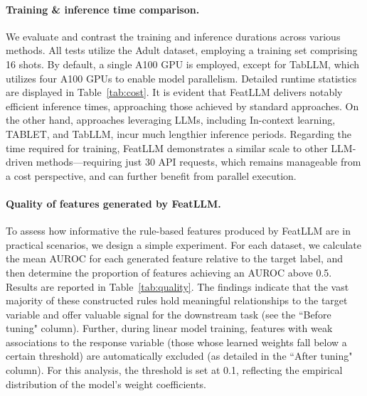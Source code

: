 \vspace*{-0.12in}
\paragraph{Training \& inference time comparison.} We evaluate and contrast the training and inference durations across various methods. All tests utilize the Adult dataset, employing a training set comprising 16 shots. By default, a single A100 GPU is employed, except for TabLLM, which utilizes four A100 GPUs to enable model parallelism. Detailed runtime statistics are displayed in Table~\ref{tab:cost}. It is evident that \textsf{FeatLLM} delivers notably efficient inference times, approaching those achieved by standard approaches. On the other hand, approaches leveraging LLMs, including In-context learning, TABLET, and TabLLM, incur much lengthier inference periods. Regarding the time required for training, \textsf{FeatLLM} demonstrates a similar scale to other LLM-driven methods—requiring just 30 API requests, which remains manageable from a cost perspective, and can further benefit from parallel execution.

\vspace*{-0.12in}
\paragraph{Quality of features generated by \textsf{FeatLLM}.}
To assess how informative the rule-based features produced by \textsf{FeatLLM} are in practical scenarios, we design a simple experiment. For each dataset, we calculate the mean AUROC for each generated feature relative to the target label, and then determine the proportion of features achieving an AUROC above 0.5. 
Results are reported in Table~\ref{tab:quality}. The findings indicate that the vast majority of these constructed rules hold meaningful relationships to the target variable and offer valuable signal for the downstream task (see the ``Before tuning" column). Further, during linear model training, features with weak associations to the response variable (those whose learned weights fall below a certain threshold) are automatically excluded (as detailed in the ``After tuning" column). For this analysis, the threshold is set at 0.1, reflecting the empirical distribution of the model's weight coefficients.

\vspace*{-0.12in}
